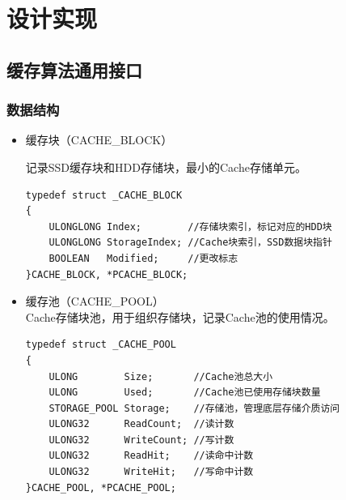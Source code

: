 
\chapter{设计实现}
\label{cha:mainmatter}

\section{缓存算法通用接口}
\label{sec:cache_interface}

\subsection{数据结构}
\begin{itemize}

\item 缓存块（CACHE\_BLOCK）

记录SSD缓存块和HDD存储块，最小的Cache存储单元。
\begin{lstlisting}
typedef struct _CACHE_BLOCK
{
    ULONGLONG Index;        //存储块索引，标记对应的HDD块
    ULONGLONG StorageIndex; //Cache块索引，SSD数据块指针
    BOOLEAN   Modified;     //更改标志
}CACHE_BLOCK, *PCACHE_BLOCK;
\end{lstlisting}

\item 缓存池（CACHE\_POOL）
\\Cache存储块池，用于组织存储块，记录Cache池的使用情况。
\begin{lstlisting}
typedef struct _CACHE_POOL
{
    ULONG        Size;       //Cache池总大小
    ULONG        Used;       //Cache池已使用存储块数量
    STORAGE_POOL Storage;    //存储池，管理底层存储介质访问
    ULONG32      ReadCount;  //读计数
    ULONG32      WriteCount; //写计数
    ULONG32      ReadHit;    //读命中计数
    ULONG32      WriteHit;   //写命中计数
}CACHE_POOL, *PCACHE_POOL;
\end{lstlisting}

\end{itemize}

